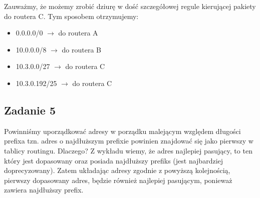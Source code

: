 \documentclass[a4paper]{article}
\begin{document}
Zauważmy, że możemy zrobić dziurę w dość szczegółowej regule kierującej pakiety do routera C. Tym sposobem otrzymujemy:

\begin{itemize}
\item 0.0.0.0/0 $\rightarrow$ do routera A
\item 10.0.0.0/8 $\rightarrow$ do routera B
\item 10.3.0.0/27 $\rightarrow$ do routera C
\item 10.3.0.192/25 $\rightarrow$ do routera C
\end{itemize}

\subsection*{Zadanie 5}
Powinniśmy uporządkować adresy w porządku malejącym względem długości prefixa tzn. adres o najdłuższym prefixie powinien znajdować się jako pierwszy w tablicy routingu. Dlaczego? Z wykładu wiemy, że adres najlepiej pasujący, to ten który jest dopasowany oraz posiada najdłuższy prefiks (jest najbardziej doprecyzowany). Zatem układając adresy zgodnie z powyższą kolejnością, pierwszy dopasowany adres, będzie również najlepiej pasującym, ponieważ zawiera najdłuższy prefix.

\clearpage
\end{document}
